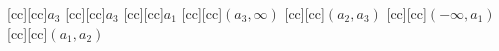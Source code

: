 [cc][cc]{$a_3$}
[cc][cc]{$a_3$}
[cc][cc]{$a_1$}
[cc][cc]{$(a_3, \infty)$}
[cc][cc]{$(a_2, a_3)$}
[cc][cc]{$(-\infty, a_1)$}
[cc][cc]{$(a_1, a_2)$}
